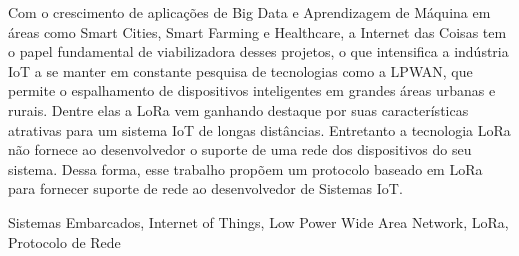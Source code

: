 \resumo
Com o crescimento de aplicações de Big Data e Aprendizagem de Máquina em
áreas como Smart Cities, Smart Farming e Healthcare, a Internet das Coisas
tem o papel fundamental de viabilizadora desses projetos, o que intensifica a
indústria IoT a se manter em constante pesquisa de tecnologias como a LPWAN,
que permite o espalhamento de dispositivos inteligentes em
grandes áreas urbanas e rurais. Dentre elas a LoRa vem ganhando
destaque por suas características atrativas para um sistema IoT de longas distâncias. 
Entretanto a tecnologia LoRa não fornece ao desenvolvedor o suporte de uma rede dos 
dispositivos do seu sistema. Dessa forma, esse trabalho propõem
um protocolo baseado em LoRa para fornecer suporte de rede ao desenvolvedor de
Sistemas IoT.
\begin{keywords}
Sistemas Embarcados, Internet of Things, Low Power Wide Area Network, LoRa, Protocolo de Rede
\end{keywords}